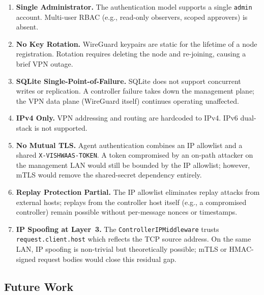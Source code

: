 \documentclass[conference]{IEEEtran}
\begin{document}
\begin{enumerate}
  \item \textbf{Single Administrator.} The authentication model supports a single
        \texttt{admin} account. Multi-user RBAC (e.g., read-only observers,
        scoped approvers) is absent.
  \item \textbf{No Key Rotation.} WireGuard keypairs are static for the lifetime
        of a node registration. Rotation requires deleting the node and
        re-joining, causing a brief VPN outage.
  \item \textbf{SQLite Single-Point-of-Failure.} SQLite does not support
        concurrent writes or replication. A controller failure takes down the
        management plane; the VPN data plane (WireGuard itself) continues
        operating unaffected.
  \item \textbf{IPv4 Only.} VPN addressing and routing are hardcoded to IPv4.
        IPv6 dual-stack is not supported.
  \item \textbf{No Mutual TLS.} Agent authentication combines an IP allowlist
        and a shared \texttt{X-VISHWAAS-TOKEN}. A token compromised by an
        on-path attacker on the management LAN would still be bounded by the IP
        allowlist; however, mTLS would remove the shared-secret dependency entirely.
  \item \textbf{Replay Protection Partial.} The IP allowlist eliminates replay
        attacks from external hosts; replays from the controller host itself (e.g.,
        a compromised controller) remain possible without per-message nonces or
        timestamps.
  \item \textbf{IP Spoofing at Layer~3.} The \texttt{ControllerIPMiddleware}
        trusts \texttt{request.client.host} which reflects the TCP source address.
        On the same LAN, IP spoofing is non-trivial but theoretically possible;
        mTLS or HMAC-signed request bodies would close this residual gap.
\end{enumerate}

\subsection{Future Work}
\end{document}
